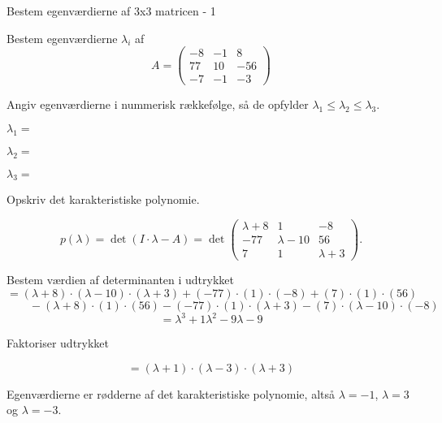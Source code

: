\documentclass{article}
\begin{document}
\tableofcontents
\newpage

\begin{exercise}{Bestem egenværdierne af 3x3 matricen - 1}

Bestem egenværdierne $\lambda_i$ af 
\[
A=\begin{pmatrix}
-8 & -1 & 8 \\
77 & 10 & -56 \\
-7 & -1 & -3
\end{pmatrix}
\]

Angiv egenværdierne i nummerisk rækkefølge, så de
opfylder $\lambda_1 \le \lambda_2 \le \lambda_3$.

$\lambda_1 = $ 

$\lambda_2 = $ 

$\lambda_3 = $ 

\hint
Opskriv det karakteristiske polynomie.

\hint
\[
p(\lambda)=\det\left(I \cdot \lambda - A \right)=\det\begin{pmatrix}
\lambda + 8  & 1 & -8 \\
-77 & \lambda - 10 & 56 \\
7 & 1 & \lambda + 3
\end{pmatrix}.
\]

\hint
Bestem værdien af determinanten i udtrykket
\[
=(\lambda+8) \cdot (\lambda-10) \cdot (\lambda+3)+(-77) \cdot (1) \cdot (-8)+(7) \cdot (1) \cdot (56)
\]
\[
\qquad -(\lambda+8) \cdot (1) \cdot (56)-(-77) \cdot (1) \cdot (\lambda+3)-(7) \cdot (\lambda-10) \cdot (-8)
\]
\[ 
=\lambda^3+1\lambda^2-9\lambda-9
\]

\hint
Faktoriser udtrykket

\hint
\[
=(\lambda+1) \cdot (\lambda-3) \cdot (\lambda+3)
\]

\hint
Egenværdierne er rødderne af det karakteristiske polynomie, 
altså
$\lambda=-1$, $\lambda=3$ og $\lambda=-3$.

\end{exercise}
\end{document}
